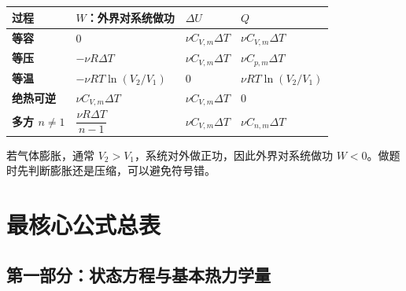 \begin{FormulaBox}[理想气体过程速查]
\begin{tabularx}{\textwidth}{@{}>{\bfseries}lXXX@{}}
\toprule
过程 & \(W\)：外界对系统做功 & \(\Delta U\) & \(Q\)\\
\midrule

等容 &
\(0\) &
\(\nu C_{V,m}\Delta T\) &
\(\nu C_{V,m}\Delta T\)\\[0.5em]

等压 &
\(-\nu R\Delta T\) &
\(\nu C_{V,m}\Delta T\) &
\(\nu C_{p,m}\Delta T\)\\[0.5em]

等温 &
\(-\nu RT\ln(V_2/V_1)\) &
\(0\) &
\(\nu RT\ln(V_2/V_1)\)\\[0.5em]

绝热可逆 &
\(\nu C_{V,m}\Delta T\) &
\(\nu C_{V,m}\Delta T\) &
\(0\)\\[0.5em]

多方 \(n\ne1\) &
\(\dfrac{\nu R\Delta T}{n-1}\) &
\(\nu C_{V,m}\Delta T\) &
\(\nu C_{n,m}\Delta T\)\\

\bottomrule
\end{tabularx}
\end{FormulaBox}

\begin{WarnBox}[符号检查]
若气体膨胀，通常 \(V_2>V_1\)，系统对外做正功，因此外界对系统做功 \(W<0\)。做题时先判断膨胀还是压缩，可以避免符号错。
\end{WarnBox}

\section{最核心公式总表}

\subsection{第一部分：状态方程与基本热力学量}


